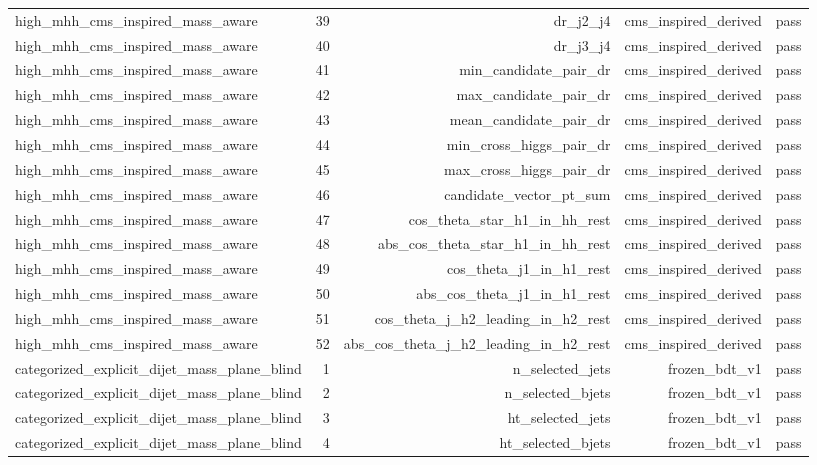 \begin{table}[htbp]
\begin{tabular}{lrrrr}
high\_mhh\_cms\_inspired\_mass\_aware & 39 & dr\_j2\_j4 & cms\_inspired\_derived & pass \\
high\_mhh\_cms\_inspired\_mass\_aware & 40 & dr\_j3\_j4 & cms\_inspired\_derived & pass \\
high\_mhh\_cms\_inspired\_mass\_aware & 41 & min\_candidate\_pair\_dr & cms\_inspired\_derived & pass \\
high\_mhh\_cms\_inspired\_mass\_aware & 42 & max\_candidate\_pair\_dr & cms\_inspired\_derived & pass \\
high\_mhh\_cms\_inspired\_mass\_aware & 43 & mean\_candidate\_pair\_dr & cms\_inspired\_derived & pass \\
high\_mhh\_cms\_inspired\_mass\_aware & 44 & min\_cross\_higgs\_pair\_dr & cms\_inspired\_derived & pass \\
high\_mhh\_cms\_inspired\_mass\_aware & 45 & max\_cross\_higgs\_pair\_dr & cms\_inspired\_derived & pass \\
high\_mhh\_cms\_inspired\_mass\_aware & 46 & candidate\_vector\_pt\_sum & cms\_inspired\_derived & pass \\
high\_mhh\_cms\_inspired\_mass\_aware & 47 & cos\_theta\_star\_h1\_in\_hh\_rest & cms\_inspired\_derived & pass \\
high\_mhh\_cms\_inspired\_mass\_aware & 48 & abs\_cos\_theta\_star\_h1\_in\_hh\_rest & cms\_inspired\_derived & pass \\
high\_mhh\_cms\_inspired\_mass\_aware & 49 & cos\_theta\_j1\_in\_h1\_rest & cms\_inspired\_derived & pass \\
high\_mhh\_cms\_inspired\_mass\_aware & 50 & abs\_cos\_theta\_j1\_in\_h1\_rest & cms\_inspired\_derived & pass \\
high\_mhh\_cms\_inspired\_mass\_aware & 51 & cos\_theta\_j\_h2\_leading\_in\_h2\_rest & cms\_inspired\_derived & pass \\
high\_mhh\_cms\_inspired\_mass\_aware & 52 & abs\_cos\_theta\_j\_h2\_leading\_in\_h2\_rest & cms\_inspired\_derived & pass \\
categorized\_explicit\_dijet\_mass\_plane\_blind & 1 & n\_selected\_jets & frozen\_bdt\_v1 & pass \\
categorized\_explicit\_dijet\_mass\_plane\_blind & 2 & n\_selected\_bjets & frozen\_bdt\_v1 & pass \\
categorized\_explicit\_dijet\_mass\_plane\_blind & 3 & ht\_selected\_jets & frozen\_bdt\_v1 & pass \\
categorized\_explicit\_dijet\_mass\_plane\_blind & 4 & ht\_selected\_bjets & frozen\_bdt\_v1 & pass \\

\end{tabular}
\end{table}
